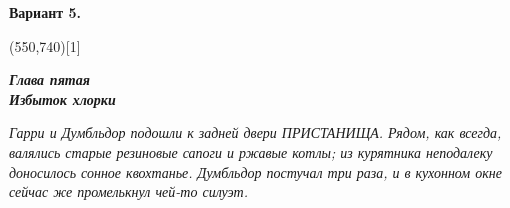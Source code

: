 \documentclass[12pt]{article}
\begin{document}
\textbf{Вариант 5.}
\begin{flushleft}
\framebox(550,740)[1]{

\begin{minipage}[0]{540pt}

\begin{flushright}
\textbf{{\large \textit{Глава пятая\\Избыток хлорки}}}
\end{flushright}

\vspace*{-10pt}
\hspace{3mm}\textit{Гарри и Думбльдор подошли к задней двери  \textnormal{ПРИСТАНИЩА}. Рядом, как всегда, валялись старые резиновые сапоги и ржавые котлы; из курятника неподалеку доносилось сонное квохтанье. Думбльдор постучал три раза, и в кухонном окне сейчас же промелькнул чей-то силуэт.}


\end{minipage}}
\end{flushleft}
\end{document}
